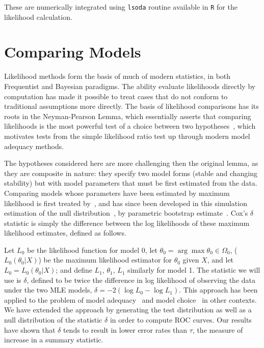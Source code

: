 \documentclass[authoryear, preprint,review,12pt]{elsarticle}
\begin{document}
These are numerically integrated using \texttt{lsoda} routine available in \texttt{R} for the likelihood calculation.  

\section{Comparing Models}\label{Cox}
Likelihood methods form the basis of much of modern statistics, in both Frequentist and Bayesian paradigms.  
The ability evaluate likelihoods directly by computation has made it possible to treat cases that do not conform to traditional assumptions more directly.
The basis of likelihood comparisons has its roots in the Neyman-Pearson Lemma, 
which essentially asserts that comparing likelihoods is the most powerful test
of a choice between two hypotheses~\citep{Neyman1933}, which motivates
tests from the simple likelihood ratio test up through modern model adequacy methods.

The hypotheses considered here are more challenging then the original lemma, as they are composite in nature:
they specify two model forms (stable and changing stability)
but with model parameters that must be first estimated from the data.
Comparing models whose parameters have been estimated by maximum likelihood is first treated by~\citet{Cox1961, Cox1962},
and has since been developed in this simulation estimation of the null distribution~\citep{McLachlan1987}, by parametric bootstrap estimate~\citep{Efron1987}.  
Cox's $\delta$ statistic is simply the difference between the log likelihoods of these maximum likelihood estimates, defined as follows.

Let $L_0$ be the likelihood function for model 0, 
let $\theta_0 = \arg \max \theta_0 \in \Omega_0$, ($L_0 (\theta_0 |X)$) 
be the maximum likelihood estimator for $\theta_0$ given $X$, and let $L_0 = L_0 (\theta_0 |X)$; 
and define $L_1$, $\theta_1$, $L_1$ similarly for model 1. 
The statistic we will use is $\delta$, 
defined to be twice the difference in log likelihood of observing the data under the two MLE models,
$\delta = -2 (\log L_0 - \log L_1 )$.  
This approach has been applied to the problem of model adequacy~\citep{Goldman1993} and model choice~\citep{Huelsenbeck1996} in other contexts.  
We have extended the approach by generating the test distribution as well as a null distribution of the statistic $\delta$ in order to compute ROC curves.  
Our results have shown that $\delta$ tends to result in lower error rates than $\tau$, the measure of increase in a summary statistic.  
\end{document}
